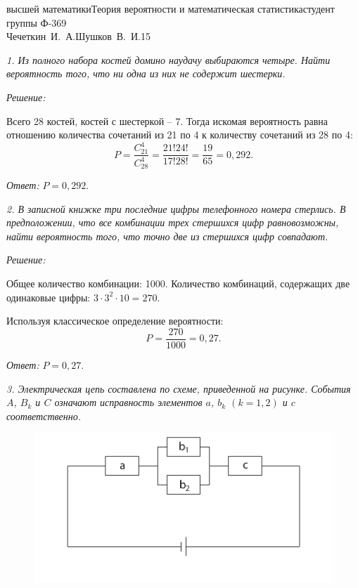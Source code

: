 



\newcommand{\ds}{\displaystyle}


{высшей математики}{Теория вероятности и математическая статистика}{студент
группы Ф-369\\Чечеткин~И.~А.}{Шушков~В.~И.}{\!\!}{15}

\emph{1. Из полного набора костей домино наудачу выбираются четыре. Найти вероятность
того, что ни одна из них не содержит шестерки.}

\vspace*{2em}
\emph{Решение:}

Всего 28 костей, костей с шестеркой -- 7. Тогда искомая вероятность равна
отношению количества сочетаний из 21 по 4 к количеству сочетаний из 28 по 4:
\[
    P = \frac{C_{21}^4}{C_{28}^4} = \frac{21!24!}{17!28!} = \frac{19}{65} = 0,292.
\]

\vspace*{2em}
\emph{Ответ:} \( P = 0,292 \).

\vspace*{2em}

\emph{2. В записной книжке три последние цифры телефонного номера стерлись. В
предположении, что все комбинации трех стершихся цифр равновозможны, найти
вероятность того, что точно две из стершихся цифр совпадают.}

\vspace*{2em}
\emph{Решение:}

Общее количество комбинации: 1000. Количество комбинаций, содержащих две
одинаковые цифры: \( 3\cdot 3^2 \cdot 10 = 270 \).

Используя классическое определение вероятности:
\[
    P = \frac{270}{1000} = 0,27.
\]

\vspace*{2em}
\emph{Ответ:} \( P = 0,27 \).

\pagebreak

\emph{3. Электрическая цепь составлена по схеме, приведенной на рисунке. События
\( A \), \( B_k \) и \( C \) означают исправность элементов \( a \), \( b_k \)
\( (k = 1, 2) \) и \( c \) соответственно.}

\begin{figure}[h!]
    \center
    \includegraphics[width=.5\textwidth]{15_3}
\end{figure}

